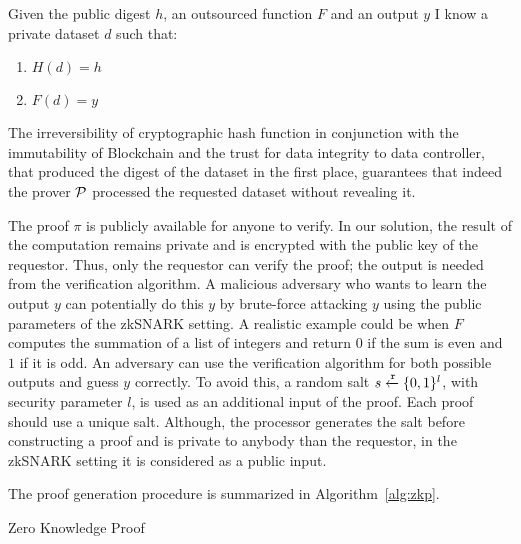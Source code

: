 Given the public digest $h$, an outsourced function $F$ and an output $y$ I know a private dataset $d$ such that:
  \begin{enumerate}
    \item $H(d) = h$
    \item $F(d) = y$
  \end{enumerate}

The irreversibility of cryptographic hash function in conjunction with the immutability of Blockchain and the trust for data integrity to data controller, that produced the digest of the dataset in the first place, guarantees that indeed the prover $\mathcal{P}$ processed the requested dataset without revealing it.

The proof $\pi$ is publicly available for anyone to verify. In our solution, the result of the computation remains private and is encrypted with the public key of the requestor. Thus, only the requestor can verify the proof; the output is needed from the verification algorithm. A malicious adversary who wants to learn the output $y$ can potentially do this $y$ by brute-force attacking $y$ using the public parameters of the zkSNARK setting. A realistic example could be when $F$ computes the summation of a list of integers and return $0$ if the sum is even and $1$ if it is odd. An adversary can use the verification algorithm for both possible outputs and guess $y$ correctly. To avoid this, a random salt $s \xleftarrow{\mathtt{r}}{\{0, 1\}^{l}}$, with security parameter $l$, is used as an additional input of the proof. Each proof should use a unique salt. Although, the processor generates the salt before constructing a proof and is private to anybody than the requestor, in the zkSNARK setting it is considered as a public input.

The proof generation procedure is summarized in Algorithm~\ref{alg:zkp}.

\begin{algorithm}[!htb]
  \caption{Zero Knowledge Proof}\label{alg:zkp}
  \begin{algorithmic}[1]
     
     
    \EndIf
     
    \State {} 
  \EndFunction
     
     
  \EndProcedure
  \end{algorithmic}
\end{algorithm}

